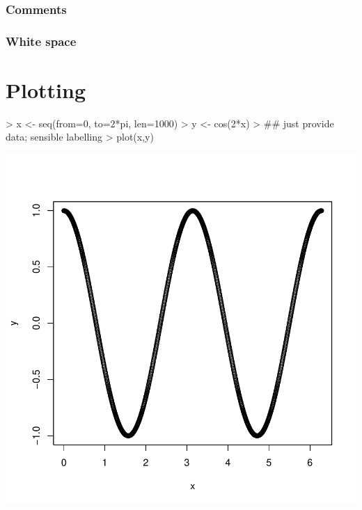 \documentclass[10pt,letterpaper]{article}
\newenvironment{Schunk}{}{}
\begin{document}
\subsubsection{Comments} %
\label{ssub:comments}


\subsubsection{White space} %
\label{ssub:white_space}




\section{Plotting} %
\label{sec:plotting}

\begin{center}
\begin{Schunk}
\begin{Sinput}
> x <- seq(from=0, to=2*pi, len=1000)
> y <- cos(2*x)
> ## just provide data; sensible labelling
> plot(x,y)
\end{Sinput}
\end{Schunk}
\includegraphics{Lab0-plotting_1}
\end{center}
\end{document}
